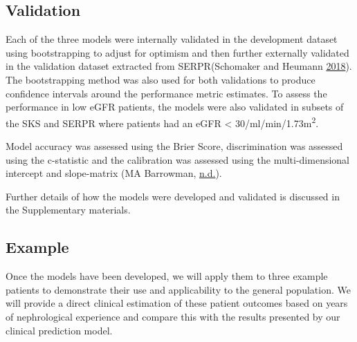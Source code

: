 \documentclass[
]{article}
\begin{document}
\hypertarget{validation}{%
\subsection{Validation}\label{validation}}

Each of the three models were internally validated in the development dataset using bootstrapping to adjust for optimism and then further externally validated in the validation dataset extracted from SERPR(Schomaker and Heumann \protect\hyperlink{ref-schomaker_bootstrap_2018}{2018}). The bootstrapping method was also used for both validations to produce confidence intervals around the performance metric estimates. To assess the performance in low eGFR patients, the models were also validated in subsets of the SKS and SERPR where patients had an eGFR \textless{} 30/ml/min/1.73m\textsuperscript{2}.

Model accuracy was assessed using the Brier Score, discrimination was assessed using the c-statistic and the calibration was assessed using the multi-dimensional intercept and slope-matrix (MA Barrowman, \protect\hyperlink{ref-chap-performance-metrics}{n.d.}).

Further details of how the models were developed and validated is discussed in the Supplementary materials.

\hypertarget{example}{%
\subsection{Example}\label{example}}

Once the models have been developed, we will apply them to three example patients to demonstrate their use and applicability to the general population. We will provide a direct clinical estimation of these patient outcomes based on years of nephrological experience and compare this with the results presented by our clinical prediction model.
\end{document}

